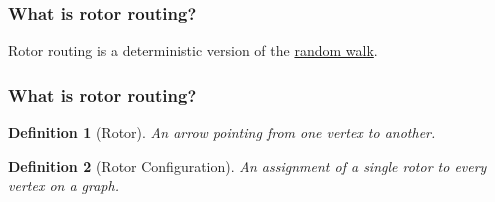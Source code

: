 \documentclass{beamer}
\newtheorem{defn}{Definition}
\begin{document}
\begin{frame}
	\frametitle{What is rotor routing?}
	
	\pause
	
	Rotor routing is a deterministic version of the \underline{random walk}.

\end{frame}


\begin{frame}
	\frametitle{What is rotor routing?}
	
  	 \begin{defn}[Rotor]
    		An arrow pointing from one vertex to another.\\
    	\end{defn}
	
    	\begin{center}
	\end{center}
	
	\pause 
	
	\begin{defn}[Rotor Configuration]
		An assignment of a single rotor to every vertex on a graph.
	\end{defn}
	
\end{frame}

\end{document}
